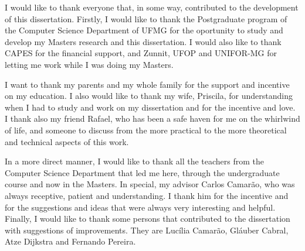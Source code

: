 I would like to thank everyone that, in some way, contributed to the development of this dissertation.
Firstly, I would like to thank the Postgraduate program of the Computer Science Department of UFMG for the oportunity to study and develop my Masters research and this dissertation.
I would also like to thank CAPES for the financial support, and Zunnit,
UFOP and UNIFOR-MG for letting me work while I was doing my Masters.

I want to thank my parents and my whole family for the support and incentive on my education.
I also would like to thank my wife, Priscila, for understanding when I had to study and work on my dissertation and for the incentive and love.
I thank also my friend Rafael, who has been a safe haven for me on the whirlwind of life, and someone to discuss from the more practical to the more theoretical and technical aspects of this work.

In a more direct manner, I would like to thank all the teachers from the Computer Science Department that led me here, through the undergraduate course and now in the Masters.
In special, my advisor Carlos Camarão, who was always receptive, patient and understanding.
I thank him for the incentive and for the suggestions and ideas that were always very interesting and helpful.
Finally, I would like to thank some persons that contributed to the dissertation with suggestions of improvements.
They are Lucília Camarão, Gláuber Cabral, Atze Dijkstra and Fernando Pereira.
